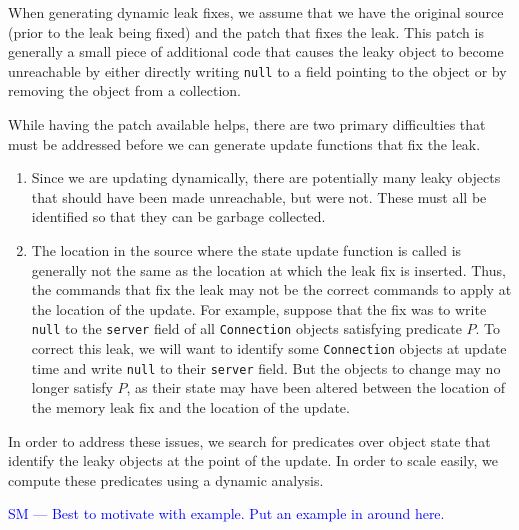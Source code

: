 \documentclass[natbib,preprint]{sigplanconf}
\newcommand{\stephencomment}[1]{\textcolor{blue}{SM --- #1}}
\begin{document}
When generating dynamic leak fixes, we assume that we have the
original source (prior to the leak being fixed) and the patch that
fixes the leak.  This patch is generally a small piece of additional code
that causes the leaky object to become unreachable by either directly writing
\texttt{null} to a field pointing to the object or by removing the
object from a collection.

While having the patch available helps, there are two primary
difficulties that must be addressed before we can generate update
functions that fix the leak.

\begin{enumerate}
\item
\label{enum:identify}
Since we are updating dynamically, there are potentially many leaky
objects that should have been made unreachable, but were not.  These
must all be identified so that they can be garbage collected.
\item 
\label{enum:different-loc}
The location in the source where the state update function is called
is generally not the same as the location at which the leak fix is
inserted.  Thus, the commands that fix the leak may not be the correct
commands to apply at the location of the update.  For example, suppose
that the fix was to write \texttt{null} to the \texttt{server} field
of all \texttt{Connection} objects satisfying predicate $P$.  To
correct this leak, we will want to identify some \texttt{Connection}
objects at update time and write \texttt{null} to their
\texttt{server} field.  But the objects to change may no longer
satisfy $P$, as their state may have been altered between the location
of the memory leak fix and the location of the update.
\end{enumerate}

In order to address these issues, we search for predicates over object
state that identify the leaky objects at the point of the update.  In
order to scale easily, we compute these predicates using a dynamic
analysis.

\stephencomment{Best to motivate with example.  Put an example in around here.}
\end{document}
